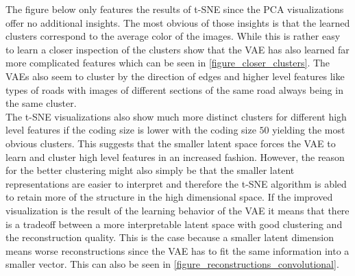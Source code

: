 The figure below only features the results of t-SNE since the PCA visualizations offer no additional insights.
The most obvious of those insights is that the learned clusters correspond to the average color of the images.
While this is rather easy to learn a closer inspection of the clusters show that the VAE has also learned far
more complicated features which can be seen in \autoref{figure_closer_clusters}. The VAEs also seem to
cluster by the direction of edges and higher level features like types of roads with images of different sections
of the same road always being in the same cluster.\\

The t-SNE visualizations also show much more distinct clusters for different high level features if the coding
size is lower with the coding size $50$ yielding the most obvious clusters. This suggests that the smaller
latent space forces the VAE to learn and cluster high level features in an increased fashion. However, 
the reason for the better clustering might also simply be that the smaller latent representations are easier
to interpret and therefore the t-SNE algorithm is abled to retain more of the structure in the high dimensional
space.
If the improved visualization is the result of the learning behavior of the VAE 
it means that there is a tradeoff between a more interpretable latent space with 
good clustering and the reconstruction quality. This is the case because a smaller latent dimension 
means worse reconstructions
since the VAE has to fit the same information into a smaller vector. This can also be seen in
\autoref{figure_reconstructions_convolutional}.

